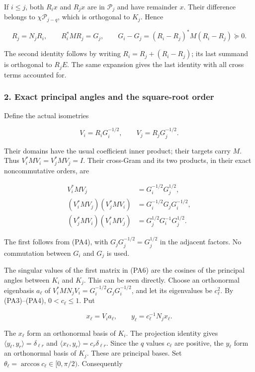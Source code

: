 If \(i\le j\), both \(R_i x\) and \(R_jx\) are in \(\mathcal P_j\) and have remainder \(x\). Their difference belongs to \(\chi\mathcal P_{j-q}\), which is orthogonal to \(K_j\). Hence

\[
\boxed{R_j=N_jR_i},\qquad
R_i^*MR_j=G_j,
\qquad
G_i-G_j=(R_i-R_j)^*M(R_i-R_j)\succeq0.
\tag{PA4}
\]

The second identity follows by writing \(R_i=R_j+(R_i-R_j)\); its last summand is orthogonal to \(R_jE\). The same expansion gives the last identity with all cross terms accounted for.

\subsubsection{2. Exact principal angles and the square-root order}\label{endpoint-principal_angle_volume_review--exact-principal-angles-and-the-square-root-order}

Define the actual isometries

\[
V_i=R_iG_i^{-1/2},\qquad V_j=R_jG_j^{-1/2}.
\tag{PA5}
\]

Their domains have the usual coefficient inner product; their targets carry \(M\). Thus \(V_i^*MV_i=V_j^*MV_j=I\). Their cross-Gram and its two products, in their exact noncommutative orders, are

\[
\begin{aligned}
V_i^*MV_j&=G_i^{-1/2}G_j^{1/2},\\
(V_i^*MV_j)(V_j^*MV_i)
&=G_i^{-1/2}G_jG_i^{-1/2},\\
(V_j^*MV_i)(V_i^*MV_j)
&=G_j^{1/2}G_i^{-1}G_j^{1/2}.
\end{aligned}
\tag{PA6}
\]

The first follows from (PA4), with \(G_jG_j^{-1/2}=G_j^{1/2}\) in the adjacent factors. No commutation between \(G_i\) and \(G_j\) is used.

The singular values of the first matrix in (PA6) are the cosines of the principal angles between \(K_i\) and \(K_j\). This can be seen directly. Choose an orthonormal eigenbasis \(a_\ell\) of \(V_i^*MN_jV_i=G_i^{-1/2}G_jG_i^{-1/2}\), and let its eigenvalues be \(c_\ell^2\). By (PA3)--(PA4), \(0<c_\ell\le1\). Put

\[
x_\ell=V_i a_\ell,\qquad
y_\ell=c_\ell^{-1}N_jx_\ell.
\tag{PA7}
\]

The \(x_\ell\) form an orthonormal basis of \(K_i\). The projection identity gives \(\langle y_\ell,y_r\rangle=\delta_{\ell r}\) and \(\langle x_\ell,y_r\rangle=c_r\delta_{\ell r}\). Since the \(q\) values \(c_\ell\) are positive, the \(y_\ell\) form an orthonormal basis of \(K_j\). These are principal bases. Set \(\theta_\ell=\arccos c_\ell\in[0,\pi/2)\). Consequently

